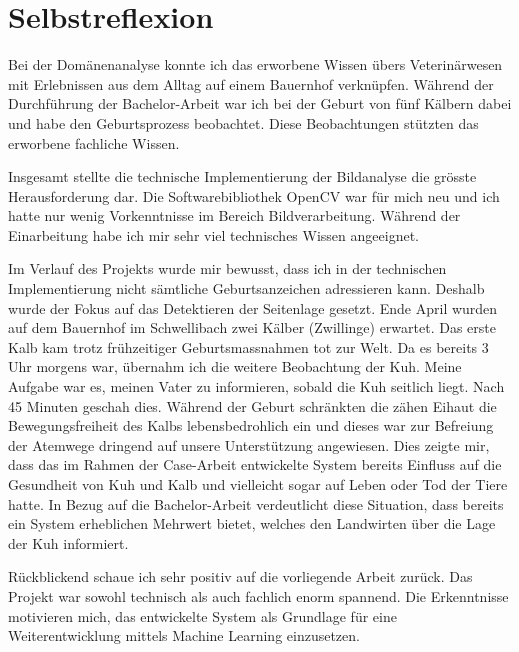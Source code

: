 

\chapter{Selbstreflexion}

Bei der Domänenanalyse konnte ich das erworbene Wissen übers Veterinärwesen mit Erlebnissen aus dem Alltag auf einem Bauernhof verknüpfen. Während der Durchführung der Bachelor-Arbeit war ich bei der Geburt von fünf Kälbern dabei und habe den Geburtsprozess beobachtet. Diese Beobachtungen stützten das erworbene fachliche Wissen.

Insgesamt stellte die technische Implementierung der Bildanalyse die grösste Herausforderung dar. Die Softwarebibliothek OpenCV war für mich neu und ich hatte nur wenig Vorkenntnisse im Bereich Bildverarbeitung. Während der Einarbeitung habe ich mir sehr viel technisches Wissen angeeignet. 

Im Verlauf des Projekts wurde mir bewusst, dass ich in der technischen Implementierung nicht sämtliche Geburtsanzeichen adressieren kann. Deshalb wurde der Fokus auf das Detektieren der Seitenlage gesetzt. Ende April wurden auf dem Bauernhof im Schwellibach zwei Kälber (Zwillinge) erwartet. Das erste Kalb kam trotz frühzeitiger Geburtsmassnahmen tot zur Welt. Da es bereits 3 Uhr morgens war, übernahm ich die weitere Beobachtung der Kuh. Meine Aufgabe war es, meinen Vater zu informieren, sobald die Kuh seitlich liegt. Nach 45 Minuten geschah dies. Während der Geburt schränkten die zähen \gls{Eihaut} die Bewegungsfreiheit des Kalbs lebensbedrohlich ein und dieses war zur Befreiung der Atemwege dringend auf unsere Unterstützung angewiesen. Dies zeigte mir, dass das im Rahmen der Case-Arbeit entwickelte System bereits Einfluss auf die Gesundheit von Kuh und Kalb und vielleicht sogar auf Leben oder Tod der Tiere hatte. In Bezug auf die Bachelor-Arbeit verdeutlicht diese Situation, dass bereits ein System erheblichen Mehrwert bietet, welches den Landwirten über die Lage der Kuh informiert. 

Rückblickend schaue ich sehr positiv auf die vorliegende Arbeit zurück. Das Projekt war sowohl technisch als auch fachlich enorm spannend. Die Erkenntnisse motivieren mich, das entwickelte System als Grundlage für eine Weiterentwicklung mittels Machine Learning einzusetzen.